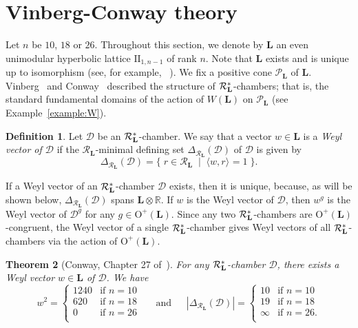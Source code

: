 \documentclass{amsart}
\theoremstyle{plain}
\newtheorem{theorem}{Theorem}[section]
\theoremstyle{definition}
\newtheorem{definition}[theorem]{Definition}
\theoremstyle{remark}
\numberwithin{equation}{section}
\numberwithin{table}{section}
\numberwithin{figure}{section}
\newcommand{\R}{\mathord{\mathbb R}}
\newcommand{\DDD}{\mathord{\mathcal D}}
\newcommand{\PPP}{\mathord{\mathcal P}}
\newcommand{\RRR}{\mathord{\mathcal R}}
\newcommand{\set}[2]{\{\; {#1} \; \mid \; {#2} \;  \}}
\newcommand{\tensor}{\otimes}
\newcommand{\OG}{\mathord{\mathrm {O}}}
\newcommand{\rmand}{\textrm{and}}
\newcommand{\quand}{\quad\rmand\quad}
\renewcommand{\L}{\mathord{\mathbf{L}}}
\newcommand{\intM}[2]{\langle{#1}\rangle_{#2}}
\newcommand{\Roots}{\RRR}
\newcommand{\sphyp}{\sp*}
\begin{document}
\section{Vinberg-Conway theory}\label{sec:Conway}
%
%
Let $n$ be $10$, $18$ or $26$.
Throughout this section,
we denote 
by  $\L$  an even unimodular hyperbolic lattice $\mathrm{II}_{1, n-1}$ of rank $n$.
Note that  $\L$ exists and is unique up to isomorphism
(see, for example, ~\cite[Chapter V]{MR0344216}).
We fix a positive cone $\PPP_{\L}$ of $\L$.
Vinberg~\cite{MR0422505} and Conway~\cite[Chapter 27]{MR1662447} described the structure of $\Roots_{\L}\sphyp$-chambers;
that is, the standard fundamental domains of the action of $W(\L)$ on $\PPP_{\L}$ %
(see Example~\ref{example:W}).
%
\begin{definition}\label{def:LLLweylvector}
Let $\DDD$ be an $\Roots_{\L}\sphyp$-chamber.
We say that a vector $w\in \L$  is a \emph{Weyl vector of  $\DDD$}
if the $\Roots_{\L}$-minimal defining set $\Delta_{\Roots_{\L}}(\DDD)$ of $\DDD$ is given by 
%
\begin{equation*}\label{eq:DeltaL}
\Delta_{\Roots_{\L}}(\DDD)=\set{r\in \Roots_{\L}}{\intM{w, r}{}=1}.
\end{equation*}
%
\end{definition}
% 
If a Weyl vector of an $\Roots_{\L}\sphyp$-chamber $\DDD$ exists,
then it is unique, because, as will be  shown below,
$\Delta_{\Roots_{\L}}(\DDD)$ spans $\L\tensor\R$.
If $w$ is the Weyl vector of $\DDD$,
then $w^g$ is the Weyl vector of $\DDD^g$ for any $g\in \OG^+(\L)$.
Since  any two  $\Roots_{\L}\sphyp$-chambers   are $\OG^+(\L)$-congruent,
the Weyl vector  of a single $\Roots_{\L}\sphyp$-chamber
gives  Weyl vectors  of all $\Roots_{\L}\sphyp$-chambers via the action of $\OG^+(\L)$.
%
\begin{theorem}[Conway, Chapter 27 of~\cite{MR1662447}]\label{thm:Weyl}
For any   $\Roots_{\L}\sphyp$-chamber $\DDD$, 
there exists a Weyl vector  $w\in \L$ of $\DDD$.
We have 
$$
w^2=\begin{cases}
1240 & \textrm{if $n=10$} \\
620 & \textrm{if $n=18$} \\
0 & \textrm{if $n=26$} \\
\end{cases}
\;\;\quand\;\;
|\Delta_{\Roots_{\L}}(\DDD)|=\begin{cases}
10 & \textrm{if $n=10$} \\
19 & \textrm{if $n=18$} \\
\infty  & \textrm{if $n=26$}. \\
\end{cases}
$$
\end{theorem}
\end{document}
